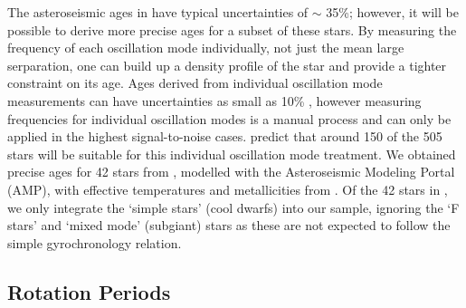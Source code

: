 \documentclass[10pt,preprint]{aastex}
\begin{document}
The asteroseismic ages in \citet{Chaplin2013} have typical uncertainties of $\sim$ 35\%; however, it will be possible to derive more precise ages for a subset of these stars.
By measuring the frequency of each oscillation mode individually, not just the mean large serparation, one can build up a density profile of the star and provide a tighter constraint on its age.
Ages derived from individual oscillation mode measurements can have uncertainties as small as 10\% \citep{Brown1994, SilvaAguirre2013}, however measuring frequencies for individual oscillation modes is a manual process and can only be applied in the highest signal-to-noise cases.
\citet{Chaplin2013} predict that around 150 of the 505 stars will be suitable for this individual oscillation mode treatment.
We obtained precise ages for 42 stars from \citet{Metcalfe2014}, modelled with the Asteroseismic Modeling Portal (AMP), with effective temperatures and metallicities from \citet{Bruntt2012}.
Of the 42 stars in \citet{Metcalfe2014}, we only integrate the `simple stars' (cool dwarfs) into our sample, ignoring the `F stars' and `mixed mode' (subgiant) stars as these are not expected to follow the simple gyrochronology relation.

\subsection{Rotation Periods}
\label{sec:rotation_periods}
\end{document}

